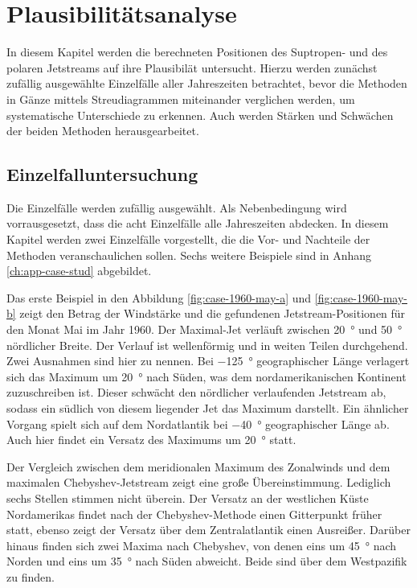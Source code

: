 \chapter{Plausibilitätsanalyse} \label{ch:plausibilitaet}
In diesem Kapitel werden die berechneten Positionen des Suptropen- und des polaren Jetstreams auf ihre Plausibilät untersucht. Hierzu werden zunächst zufällig ausgewählte Einzelfälle aller Jahreszeiten betrachtet, bevor die Methoden in Gänze mittels Streudiagrammen miteinander verglichen werden, um systematische Unterschiede zu erkennen. Auch werden Stärken und Schwächen der beiden Methoden herausgearbeitet.

\section{Einzelfalluntersuchung}
Die Einzelfälle werden zufällig ausgewählt. Als Nebenbedingung wird vorrausgesetzt, dass die acht Einzelfälle alle Jahreszeiten abdecken. In diesem Kapitel werden zwei Einzelfälle vorgestellt, die die Vor- und Nachteile der Methoden veranschaulichen sollen. Sechs weitere Beispiele sind in Anhang \ref{ch:app-case-stud} abgebildet.

Das erste Beispiel in den Abbildung \ref{fig:case-1960-may-a} und \ref{fig:case-1960-may-b} zeigt den Betrag der Windstärke und die gefundenen Jetstream-Positionen für den Monat Mai im Jahr 1960. Der Maximal-Jet verläuft zwischen \SI{20}{\degree} und \SI{50}{\degree} nördlicher Breite. Der Verlauf ist wellenförmig und in weiten Teilen durchgehend. Zwei Ausnahmen sind hier zu nennen. Bei \SI{-125}{\degree} geographischer Länge verlagert sich das Maximum um \SI{20}{\degree} nach Süden, was dem nordamerikanischen Kontinent zuzuschreiben ist. Dieser schwächt den nördlicher verlaufenden Jetstream ab, sodass ein südlich von diesem liegender Jet das Maximum darstellt. Ein ähnlicher Vorgang spielt sich auf dem Nordatlantik bei \SI{-40}{\degree} geographischer Länge ab. Auch hier findet ein Versatz des Maximums um \SI{20}{\degree} statt.

Der Vergleich zwischen dem meridionalen Maximum des Zonalwinds und dem maximalen Chebyshev-Jetstream zeigt eine große Übereinstimmung. Lediglich sechs Stellen stimmen nicht überein. Der Versatz an der westlichen Küste Nordamerikas findet nach der Chebyshev-Methode einen Gitterpunkt früher statt, ebenso zeigt der Versatz über dem Zentralatlantik einen Ausreißer. Darüber hinaus finden sich zwei Maxima nach Chebyshev, von denen eins um \SI{45}{\degree} nach Norden und eins um \SI{35}{\degree} nach Süden abweicht. Beide sind über dem Westpazifik zu finden.

